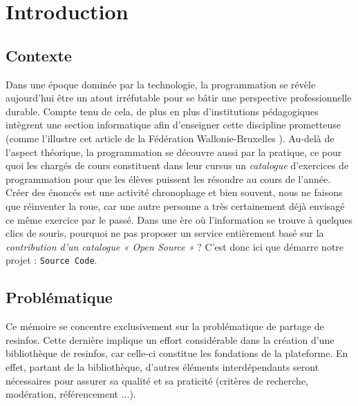 \chapter{Introduction}

\section*{Contexte}

Dans une époque dominée par la technologie, la programmation se révèle aujourd’hui être un atout irréfutable pour se bâtir une perspective professionnelle durable. Compte tenu de cela, de plus en plus d’institutions pédagogiques intègrent une section informatique afin d’enseigner cette discipline prometteuse (comme l'illustre cet article de la Fédération Wallonie-Bruxelles \cite{MAG_PROG}). Au-delà de l’aspect théorique, la programmation se découvre aussi par la pratique, ce pour quoi les chargés de cours constituent dans leur cursus un \textit{catalogue} d’exercices de programmation pour que les élèves puissent les résoudre au cours de l'année.\\

Créer des énoncés est une activité chronophage et bien souvent, nous ne faisons que réinventer la roue, car une autre personne a très certainement déjà envisagé ce même exercice par le passé.
Dans une ère où l’information se trouve à quelques clics de souris, pourquoi ne pas proposer un service entièrement basé sur la \textit{contribution d’un catalogue « Open Source »} ? C’est donc ici que démarre notre projet : \texttt{Source Code}.\\

\section*{Problématique}

Ce mémoire se concentre exclusivement sur la problématique de partage de \glspl{resinfo}.
Cette dernière implique un effort considérable dans la création d'une bibliothèque de \glspl{resinfo}, car celle-ci constitue les fondations de la plateforme. En effet, partant de la bibliothèque, d'autres éléments interdépendants seront nécessaires pour assurer sa qualité et sa praticité (critères de recherche, modération, référencement ...).

